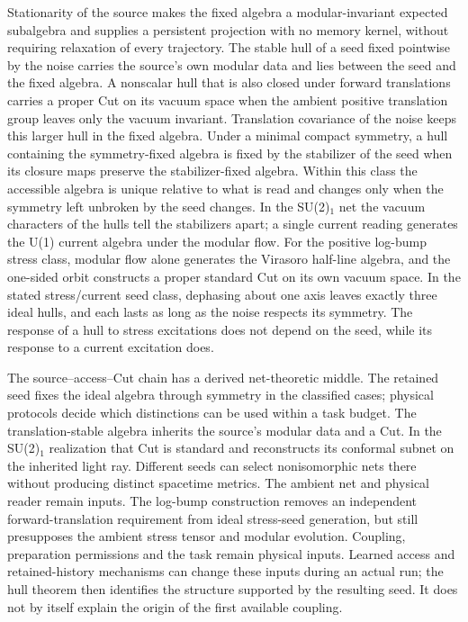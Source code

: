 \documentclass[12pt]{article}
\theoremstyle{definition}
\theoremstyle{remark}
\begin{document}
Stationarity of the source makes the fixed algebra a modular-invariant expected
subalgebra and supplies a persistent projection with no memory
kernel, without requiring relaxation of every trajectory. The stable hull
of a seed fixed pointwise by the noise carries the source's own modular data and lies
between the seed and the fixed algebra. A nonscalar hull that is also closed under
forward translations carries a proper Cut on its vacuum space when the ambient
positive translation group leaves only the vacuum invariant. Translation covariance
of the noise keeps this larger hull in the fixed algebra. Under a minimal compact
symmetry, a hull containing the symmetry-fixed algebra is fixed by the stabilizer of
the seed when its closure maps preserve the stabilizer-fixed algebra. Within this
class the accessible algebra is unique relative to what is read and changes only
when the symmetry left unbroken by the seed changes. In the SU(2)\(_1\) net the
vacuum characters of the hulls tell the stabilizers apart; a single current reading
generates the U(1) current algebra under the modular flow. For the
positive log-bump stress class, modular flow alone generates the Virasoro
half-line algebra, and the one-sided orbit constructs a proper standard
Cut on its own vacuum space. In the stated stress/current seed class,
dephasing about one axis leaves exactly three
ideal hulls, and each lasts as long as the noise respects
its symmetry. The response of a hull to stress excitations does not depend on the
seed, while its response to a current excitation does.

The source--access--Cut chain has a derived net-theoretic middle. The retained
seed fixes the ideal algebra through symmetry in the classified cases;
physical protocols decide which distinctions can be used within a task
budget. The translation-stable algebra
inherits the source's modular data and a Cut. In the SU(2)\(_1\) realization that Cut
is standard and reconstructs its conformal subnet on the inherited light ray.
Different seeds can select nonisomorphic nets there without producing distinct spacetime
metrics. The ambient net and physical reader remain inputs. The log-bump
construction removes an independent forward-translation requirement
from ideal stress-seed generation, but still presupposes the ambient
stress tensor and modular evolution. Coupling, preparation permissions
and the task remain physical inputs. Learned access and retained-history mechanisms
can change these inputs during an actual run; the hull theorem then
identifies the structure supported by the resulting seed. It does not
by itself explain the origin of the first available coupling.
\end{document}
